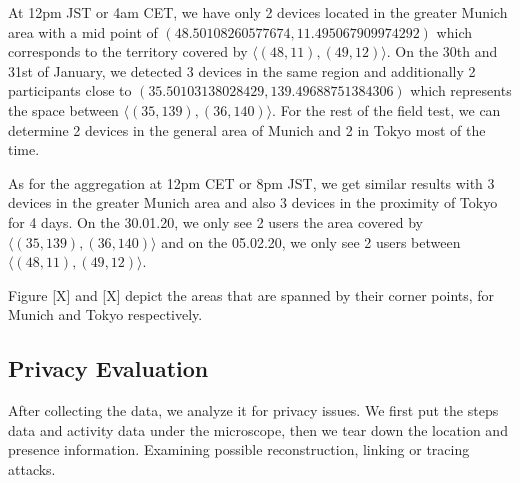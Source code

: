 At 12pm JST or 4am CET, we have only 2 devices located in the greater Munich area with a mid point of \((48.50108260577674, 11.495067909974292)\) which corresponds to the territory covered by \(\langle(48, 11),(49, 12)\rangle\). On the 30th and 31st of January, we detected 3 devices in the same region and additionally 2 participants close to \((35.50103138028429, 139.49688751384306)\) which represents the space between \(\langle(35, 139),(36, 140)\rangle\). For the rest of the field test, we can determine 2 devices in the general area of Munich and 2 in Tokyo most of the time.

As for the aggregation at 12pm CET or 8pm JST, we get similar results with 3 devices in the greater Munich area and also 3 devices in the proximity of Tokyo for 4 days. On the 30.01.20, we only see 2 users the area covered by \(\langle(35, 139),(36, 140)\rangle\) and on the 05.02.20, we only see 2 users between \(\langle(48, 11),(49, 12)\rangle\).

Figure [X] and [X] depict the areas that are spanned by their corner points, for Munich and Tokyo respectively. 


\subsection{Privacy Evaluation}
After collecting the data, we analyze it for privacy issues. We first put the steps data and activity data under the microscope, then we tear down the location and presence information. Examining possible reconstruction, linking or tracing attacks.

